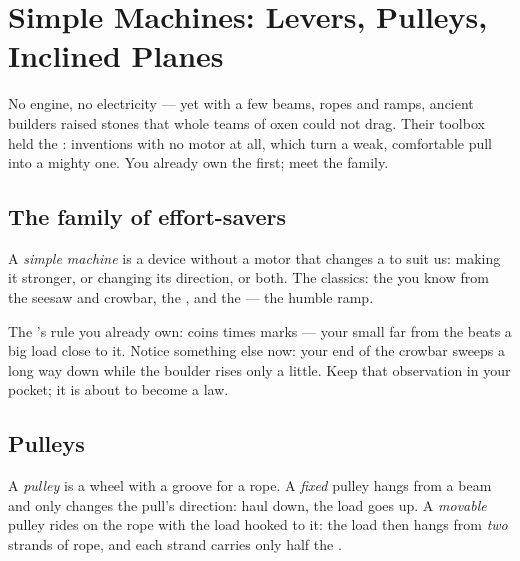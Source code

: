 \chapter{Simple Machines: Levers, Pulleys, Inclined Planes}\label{ch:g5:simple-machines}

No engine, no electricity --- yet with a few beams, ropes and ramps,
ancient builders raised stones that whole teams of oxen could not
drag. Their toolbox held the \emph{}: inventions
with no motor at all, which turn a weak, comfortable pull into a
mighty one. You already own the first; meet the family.

\section{The family of effort-savers}

\begin{definition}\label{def:g5:simple-machines:machine}
A \emph{simple machine} is a device without a
motor that changes a  to suit us: making it stronger, or
changing its direction, or both. The classics: the \emph{} you
know from the seesaw and crowbar, the \emph{}, and the
\emph{} --- the humble ramp.
\end{definition}

\begin{example}\label{ex:g5:simple-machines:lever}
The 's rule you already own: coins times marks --- your small
 far from the  beats a big load close to it. Notice
something else now: your end of the crowbar sweeps a long way down
while the boulder rises only a little. Keep that observation in
your pocket; it is about to become a law.
\end{example}

\section{Pulleys}

\begin{definition}[Pulley]\label{def:g5:simple-machines:pulley}
A \emph{pulley} is a wheel with a groove for a rope.
A \emph{fixed} pulley hangs from a beam and only changes the pull's
direction: haul down, the load goes up. A \emph{movable} pulley
rides on the rope with the load hooked to it: the load then hangs
from \emph{two} strands of rope, and each strand carries only half
the .
\end{definition}

